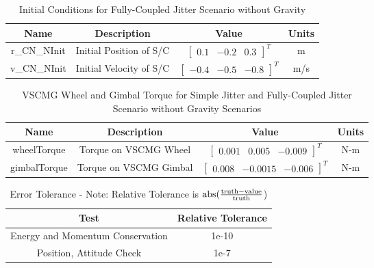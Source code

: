 \begin{table}[htbp]
	\caption{Initial Conditions for Fully-Coupled Jitter Scenario without Gravity}
	\label{tab:initial}
	\centering \fontsize{10}{10}\selectfont
	\begin{tabular}{ c | c | c | c } %
		\hline
		\textbf{Name}  & \textbf{Description}  & \textbf{Value} & \textbf{Units} \\
		\hline
		r\_CN\_NInit & Initial Position of S/C & $\begin{bmatrix}
		0.1 &	-0.2 & 0.3
		\end{bmatrix}^T$ & m \\
		v\_CN\_NInit & Initial Velocity of S/C & $\begin{bmatrix}
		-0.4 & -0.5 & -0.8
		\end{bmatrix}^T$ & m/s \\
		\hline
	\end{tabular}
\end{table}

\begin{table}[htbp]
	\caption{VSCMG Wheel and Gimbal Torque for Simple Jitter and Fully-Coupled Jitter Scenario without Gravity Scenarios}
	\label{tab:initial}
	\centering \fontsize{10}{10}\selectfont
	\begin{tabular}{ c | c | c | c } %
		\hline
		\textbf{Name}  & \textbf{Description}  & \textbf{Value} & \textbf{Units} \\
		\hline
		wheelTorque & Torque on VSCMG Wheel & $\begin{bmatrix}
		0.001 &	 0.005 & -0.009
		\end{bmatrix}^T$ & N-m \\
		gimbalTorque & Torque on VSCMG Gimbal & $\begin{bmatrix}
		0.008 & -0.0015 & -0.006
		\end{bmatrix}^T$ & N-m \\
		\hline
	\end{tabular}
\end{table}

\begin{table}[htbp]
	\caption{Error Tolerance - Note: Relative Tolerance is $\textnormal{abs}(\frac{\textnormal{truth} - \textnormal{value}}{\textnormal{truth}}$)}
	\label{tab:errortol}
	\centering \fontsize{10}{10}\selectfont
	\begin{tabular}{| c | c |} %
		\hline
		Test   & Relative Tolerance \\
		\hline
		Energy and Momentum Conservation & 1e-10 \\
		\hline
		Position, Attitude Check & 1e-7 \\
		\hline	
	\end{tabular}
\end{table}

